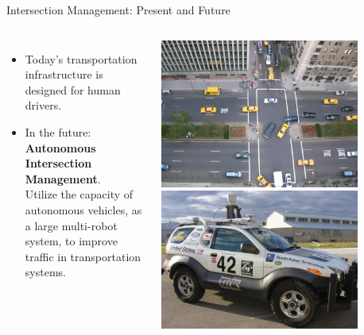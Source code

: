 \documentclass{beamer}
\begin{document}
\begin{frame}{Intersection Management: Present and Future}
\begin{columns}[c]
		\begin{itemize}
		\item Today's transportation infrastructure is designed for
		human drivers.
		\item In the future: \textbf{Autonomous Intersection
		Management}.\\
		Utilize the capacity of autonomous vehicles, as a large
		multi-robot system, to improve traffic in transportation
		systems.
		\end{itemize}
		
		\includegraphics[width=0.8\textwidth]{intersection.jpg}
		\hfill
		\includegraphics[width=0.8\textwidth]{42.png}
\end{columns}
\end{frame}
\end{document}
